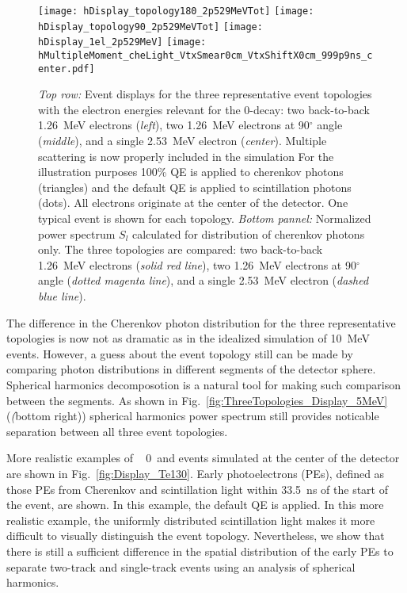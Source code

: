 \begin{figure*}[h]
  \centering
  \texttt{[image: hDisplay\_topology180\_2p529MeVTot]}
  \texttt{[image: hDisplay\_topology90\_2p529MeVTot]}
  \texttt{[image: hDisplay\_1el\_2p529MeV]}
  \texttt{[image: hMultipleMoment\_cheLight\_VtxSmear0cm\_VtxShiftX0cm\_999p9ns\_center.pdf]}
  \caption{\emph{Top row:} Event displays for the three representative event topologies with the electron energies relevant 
    for the {\Te} 0{\nbb}-decay: two back-to-back 1.26~MeV electrons (\emph{left}), two 1.26~MeV electrons at 90$^{\circ}$ angle 
    (\emph{middle}), and a single 2.53~MeV electron (\emph{center}). Multiple scattering is now properly included in the simulation
    For the illustration purposes 100\% QE is applied to cherenkov photons (triangles) and the default QE is applied to scintillation 
    photons (dots). All electrons originate at the center of the detector. One typical event is shown for each topology.
    \emph{Bottom pannel:} Normalized power spectrum $S_l$ calculated for distribution of cherenkov photons only. The three
    topologies are compared: two back-to-back 1.26~MeV electrons (\emph{solid red line}), two 1.26~MeV electrons at 90$^{\circ}$ angle
    (\emph{dotted magenta line}), and a single 2.53~MeV electron (\emph{dashed blue line}).}
  \label{fig:ThreeTopologies_Display}
\end{figure*}


The difference in the Cherenkov photon distribution for the three representative topologies is now not as dramatic as in the idealized 
simulation of 10~MeV events. However, a guess about the event topology still can be made by comparing photon distributions in different 
segments of the detector sphere. Spherical harmonics decomposotion is a natural tool for making such comparison between the segments. 
As shown in Fig.~\ref{fig:ThreeTopologies_Display_5MeV}(\emph(bottom right)) spherical harmonics power spectrum still provides noticable 
separation between all three event topologies.


More realistic examples of \Te~ 0\nbb~and \B events simulated at the center of the detector are shown in Fig.~\ref{fig:Display_Te130}. Early photoelectrons (PEs), defined as those PEs from Cherenkov and scintillation light within 33.5~ns of the start of the event, are shown. In this example, the default QE is applied.  In this more realistic example, the uniformly distributed scintillation light makes it more difficult to visually distinguish the event topology. Nevertheless, we show that there is still a sufficient difference in the spatial distribution of the early PEs to separate two-track and single-track events using an analysis of spherical harmonics.

